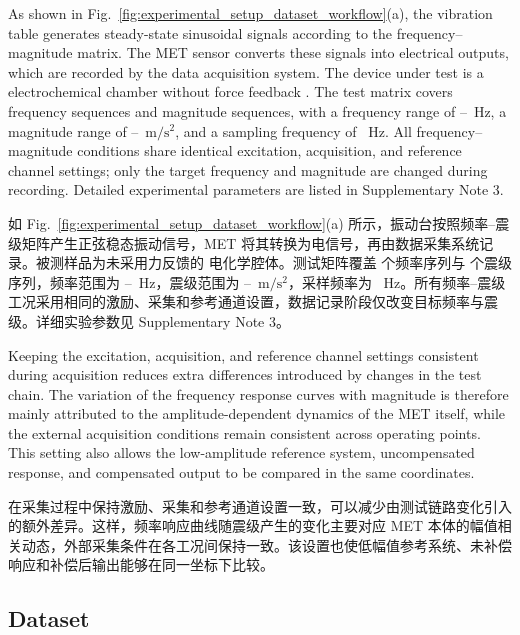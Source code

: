 \documentclass[sn-nature]{sn-jnl}
\newif\ifCNENEnglish
\newif\ifCNENBilingual
\newcommand{\CNEN}[2]{%
    \ifCNENBilingual
        #1%
        \if\relax\detokenize{#2}\relax\else\par #2\fi%
    \else
        \ifCNENEnglish
            #2%
        \else
            #1%
        \fi
    \fi
}
\begin{document}
\CNEN{如 Fig.~\ref{fig:experimental_setup_dataset_workflow}(a) 所示，振动台按照频率--震级矩阵产生正弦稳态振动信号，MET 将其转换为电信号，再由数据采集系统记录。被测样品为未采用力反馈的 \valTestSampleModel{}\cite{RSensors2024} 电化学腔体。测试矩阵覆盖 \valFreqScanPoints{} 个频率序列与 \valMagScanPoints{} 个震级序列，频率范围为 \valFreqScanStart--\valFreqScanEnd~Hz，震级范围为 \valMagScanStart--\valMagScanEnd~$\text{m}/\text{s}^2$，采样频率为 \valSamplingFreq~Hz。所有频率--震级工况采用相同的激励、采集和参考通道设置，数据记录阶段仅改变目标频率与震级。详细实验参数见 Supplementary Note 3。}{As shown in Fig.~\ref{fig:experimental_setup_dataset_workflow}(a), the vibration table generates steady-state sinusoidal signals according to the frequency--magnitude matrix. The MET sensor converts these signals into electrical outputs, which are recorded by the data acquisition system. The device under test is a \valTestSampleModel{} electrochemical chamber without force feedback \cite{RSensors2024}. The test matrix covers \valFreqScanPoints{} frequency sequences and \valMagScanPoints{} magnitude sequences, with a frequency range of \valFreqScanStart--\valFreqScanEnd~Hz, a magnitude range of \valMagScanStart--\valMagScanEnd~$\text{m}/\text{s}^2$, and a sampling frequency of \valSamplingFreq~Hz. All frequency--magnitude conditions share identical excitation, acquisition, and reference channel settings; only the target frequency and magnitude are changed during recording. Detailed experimental parameters are listed in Supplementary Note 3.%
}

\CNEN{在采集过程中保持激励、采集和参考通道设置一致，可以减少由测试链路变化引入的额外差异。这样，频率响应曲线随震级产生的变化主要对应 MET 本体的幅值相关动态，外部采集条件在各工况间保持一致。该设置也使低幅值参考系统、未补偿响应和补偿后输出能够在同一坐标下比较。}{Keeping the excitation, acquisition, and reference channel settings consistent during acquisition reduces extra differences introduced by changes in the test chain. The variation of the frequency response curves with magnitude is therefore mainly attributed to the amplitude-dependent dynamics of the MET itself, while the external acquisition conditions remain consistent across operating points. This setting also allows the low-amplitude reference system, uncompensated response, and compensated output to be compared in the same coordinates.}

\subsection{Dataset}
\end{document}

